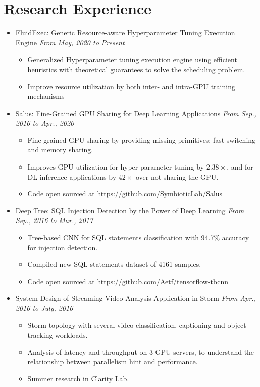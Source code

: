 \documentclass[letterpaper,11pt]{article}
\begin{document}
\section{Research Experience}
\begin{itemize}
    \item FluidExec: Generic Resource-aware Hyperparameter Tuning Execution
    Engine \hfill \textit{From May, 2020 to Present}
    \begin{itemize}
        \item Generalized Hyperparameter tuning execution engine using efficient
        heuristics with theoretical guarantees to solve the scheduling problem.
        \item Improve resource utilization by both inter- and intra-GPU training
        mechanisms
    \end{itemize}
    \item Salus: Fine-Grained GPU Sharing for Deep Learning Applications \hfill \textit{From Sep., 2016 to Apr., 2020}
    \begin{itemize}
        \item Fine-grained GPU sharing by providing missing primitives: fast 
switching and memory sharing.
        \item Improves GPU utilization for hyper-parameter tuning by $2.38\times$, and for DL 
inference applications by $42\times$ over not sharing the GPU.
        \item Code open sourced at \url{https://github.com/SymbioticLab/Salus}
    \end{itemize}

    \item Deep Tree: SQL Injection Detection by the Power of Deep Learning \hfill \textit{From Sep., 2016 to Mar., 2017}
    \begin{itemize}
        \item Tree-based CNN for SQL statements classification with 94.7\% accuracy for injection 
detection.
        \item Compiled new SQL statements dataset of 4161 samples.
        \item Code open sourced at \url{https://github.com/Aetf/tensorflow-tbcnn}
    \end{itemize}

    \item System Design of Streaming Video Analysis Application in Storm \hfill \textit{From Apr., 2016 to July, 2016}
    \begin{itemize}
        \item Storm topology with several video classification, captioning and object tracking 
workloads.
        \item Analysis of latency and throughput on 3 GPU servers, to understand the relationship 
between parallelism hint and performance.
        \item Summer research in Clarity Lab.
    \end{itemize}


\end{itemize}
\end{document}
